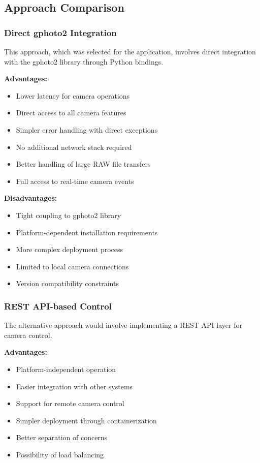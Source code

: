 \subsection{Approach Comparison}

\subsubsection{Direct gphoto2 Integration}
This approach, which was selected for the application, involves direct integration with the gphoto2 library through Python bindings.

\textbf{Advantages:}
\begin{itemize}
    \item Lower latency for camera operations
    \item Direct access to all camera features
    \item Simpler error handling with direct exceptions
    \item No additional network stack required
    \item Better handling of large RAW file transfers
    \item Full access to real-time camera events
\end{itemize}

\textbf{Disadvantages:}
\begin{itemize}
    \item Tight coupling to gphoto2 library
    \item Platform-dependent installation requirements
    \item More complex deployment process
    \item Limited to local camera connections
    \item Version compatibility constraints
\end{itemize}

\subsubsection{REST API-based Control}
The alternative approach would involve implementing a REST API layer for camera control.

\textbf{Advantages:}
\begin{itemize}
    \item Platform-independent operation
    \item Easier integration with other systems
    \item Support for remote camera control
    \item Simpler deployment through containerization
    \item Better separation of concerns
    \item Possibility of load balancing
\end{itemize}

